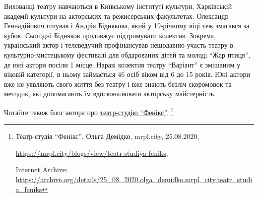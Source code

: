 
Вихованці театру навчаються в Київському інституті культури, Харківській
академії культури на акторських та режисерських факультетах. Олександр
Геннадійович готував і Андрія Біднякова, який у 19-річному віці теж змагався за
кубок. Сьогодні Бідняков продовжує підтримувати колектив. Зокрема, український
актор і телеведучий профінансував нещодавню участь театру в
культурно-мистецькому фестивалі для обдарованих дітей та молоді \enquote{Жар птиця}, де
юні актори посіли 1 місце. Наразі колектив театру \enquote{Варіант} є змішаним у
віковій категорії, в ньому займається 46 осіб віком від 6 до 15 років. Юні
актори вже не уявляють свого життя без театру і вже знають безліч скоромовок та
методик, які допомагають їм вдосконалювати акторську майстерність.

Читайте також блог автора про \href{https://archive.org/details/25_08_2020.olga_demidko.mrpl_city.teatr_studia_feniks}{театр-студію \enquote{Фенікс}}.%
\footnote{Театр-студія \enquote{Фенікс}, Ольга Демідко, mrpl.city, 25.08.2020, \par%
\url{https://mrpl.city/blogs/view/teatr-studiya-feniks}, \par%
Internet Archive: \url{https://archive.org/details/25_08_2020.olga_demidko.mrpl_city.teatr_studia_feniks}
}
